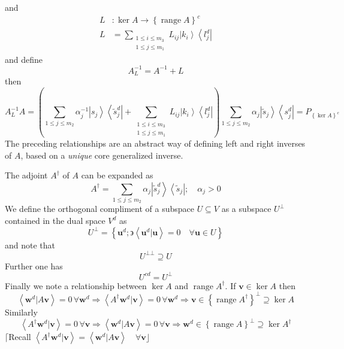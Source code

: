 \documentclass[aps,preprint]{revtex4}%
\begin{document}
and
\begin{align}
L  & :\ker A\longrightarrow\left\{  \operatorname{range}A\right\}
^{c}\nonumber\\
L  & =\sum_{\substack{1\leq i\leq m_{3}\\1\leq j\leq m_{1}}}L_{ij}\left\vert
k_{i}\right\rangle \left\langle l_{j}^{d}\right\vert
\end{align}
and define
\begin{equation}
A_{L}^{-1}=A^{-1}+L
\end{equation}
then
\begin{equation}
A_{L}^{-1}A=\left(  \sum_{1\leq j\leq m_{2}}\alpha_{j}^{-1}\left\vert
s_{j}\right\rangle \left\langle \tilde{s}_{j}^{d}\right\vert +\sum
_{\substack{1\leq i\leq m_{3}\\1\leq j\leq m_{1}}}L_{ij}\left\vert
k_{i}\right\rangle \left\langle l_{j}^{d}\right\vert \right)  \sum_{1\leq
j\leq m_{2}}\alpha_{j}\left\vert \tilde{s}_{j}\right\rangle \left\langle
s_{j}^{d}\right\vert =P_{\left\{  \ker A\right\}  ^{c}}%
\end{equation}
The preceding relationships are an abstract way of defining left and right
inverses of $A$, based on a \emph{unique} core generalized inverse.

The adjoint $A^{\dagger}$ of $A$ can be expanded as
\begin{equation}
A^{\dagger}=\sum_{1\leq j\leq m_{2}}\alpha_{j}\left\vert \tilde{s}_{j}%
^{d}\right\rangle \left\langle \tilde{s}_{j}\right\vert ;\quad\alpha_{j}>0
\end{equation}
We define the orthogonal compliment of a subspace $U\subseteq V$ as a subspace
$U^{\bot}$ contained in the dual space $V^{d}$ as
\begin{equation}
U^{\bot}=\left\{  \mathbf{u}^{d};\backepsilon\left\langle \mathbf{u}%
^{d}|\mathbf{u}\right\rangle =0\quad\forall\mathbf{u\in}U\right\}
\end{equation}
and note that
\begin{equation}
U^{\bot\bot}\supseteq U
\end{equation}
Further one has
\begin{equation}
U^{cd}=U^{\bot}%
\end{equation}
Finally we note a relationship between $\ker A$ and $\operatorname{range}%
A^{\dagger}$. If $\mathbf{v}\in\ker A$ then%
\begin{equation}
\left\langle \mathbf{w}^{d}|A\mathbf{v}\right\rangle =0\,\forall\mathbf{w}%
^{d}\Rightarrow\left\langle A^{\dagger}\mathbf{w}^{d}|\mathbf{v}\right\rangle
=0\,\forall\mathbf{w}^{d}\Rightarrow\mathbf{v}\in\left\{  \operatorname{range}%
A^{\dagger}\right\}  ^{\bot}\supseteq\ker A
\end{equation}
Similarly
\begin{equation}
\left\langle A^{\dagger}\mathbf{w}^{d}|\mathbf{v}\right\rangle =0\,\forall
\mathbf{v}\Rightarrow\left\langle \mathbf{w}^{d}|A\mathbf{v}\right\rangle
=0\,\forall\mathbf{v}\Rightarrow\mathbf{w}^{d}\in\left\{  \operatorname{range}%
A\right\}  ^{\bot}\supseteq\ker A^{\dagger}%
\end{equation}
$\lceil$Recall $\left\langle A^{\dagger}\mathbf{w}^{d}|\mathbf{v}\right\rangle
=\left\langle \mathbf{w}^{d}|A\mathbf{v}\right\rangle \quad\forall
\mathbf{v\rfloor}\ \ $
\end{document}
